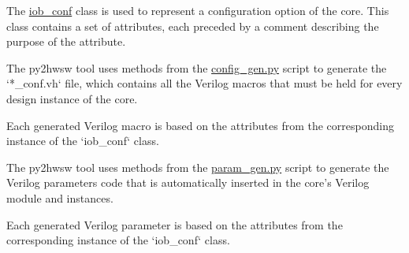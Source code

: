 %

%
%

The \href{https://github.com/IObundle/py2hwsw/blob/main/py2hwsw/scripts/iob_conf.py}{iob\_conf} class is used to represent a configuration option of the core.
This class contains a set of attributes, each preceded by a comment describing the purpose of the attribute.



%
%

The py2hwsw tool uses methods from the \href{https://github.com/IObundle/py2hwsw/blob/main/py2hwsw/scripts/config_gen.py}{config\_gen.py} script to generate the `*\_conf.vh` file, which contains all the Verilog macros that must be held for every design instance of the core.

Each generated Verilog macro is based on the attributes from the corresponding instance of the `iob\_conf` class.



The py2hwsw tool uses methods from the \href{https://github.com/IObundle/py2hwsw/blob/main/py2hwsw/scripts/param_gen.py}{param\_gen.py} script to generate the Verilog parameters code that is automatically inserted in the core's Verilog module and instances.

Each generated Verilog parameter is based on the attributes from the corresponding instance of the `iob\_conf` class.

